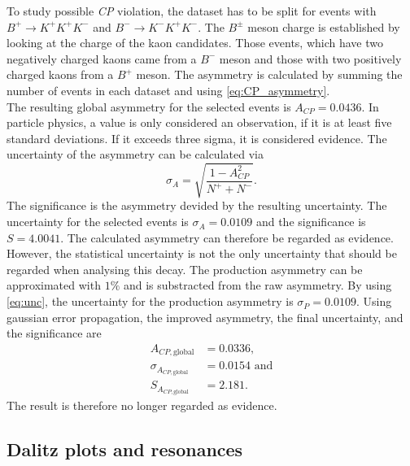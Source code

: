 To study possible \textit{CP} violation, the dataset has to be split for events with $B^+ \rightarrow K^+ K^+ K^-$ and $B^- \rightarrow K^- K^+ K^-$. The $B^{\pm}$ meson charge is established by 
looking at the charge of the kaon candidates. Those events, which have two negatively charged kaons came from a $B^-$ meson and those with two positively charged kaons from a $B^+$ meson.
The asymmetry is calculated by summing the number of events in each dataset and using \autoref{eq:CP_asymmetry}.\\
The resulting global asymmetry for the selected events is $A_{CP} = 0.0436$. In particle physics, a value is only considered an observation, if it is at least five standard deviations. If it exceeds
three sigma, it is considered evidence. The uncertainty of the asymmetry can be calculated via
\begin{equation}
  \label{eq:unc}
  \sigma_A = \sqrt{\frac{1-A_{CP}^2}{N^+ + N^-}}.
\end{equation}
The significance is the asymmetry devided by the resulting uncertainty. The uncertainty for the selected events is $\sigma_A = 0.0109$ and the significance is $S = 4.0041$. The calculated asymmetry can therefore be regarded 
as evidence.\\
However, the statistical uncertainty is not the only uncertainty that should be regarded when analysing this decay. The production asymmetry can be approximated with $1\%$ and is substracted from the raw asymmetry. By using \autoref{eq:unc}, the uncertainty
for the production asymmetry is $\sigma_P = 0.0109$. Using gaussian error propagation, the improved asymmetry, the final uncertainty, and the significance are
\begin{align*}
  A_{CP, \mathrm{global}} &= 0.0336,\\
  \sigma_{A_{CP,\mathrm{global}}} &=  0.0154\, \, \mathrm{and}\\
  S_{A_{CP,\mathrm{global}}} &= 2.181.
\end{align*}
The result is therefore no longer regarded as evidence.

\subsection{Dalitz plots and resonances}

